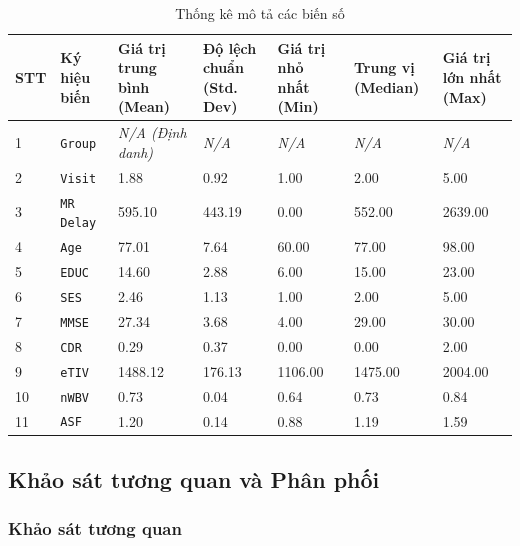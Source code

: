 \begin{table}[h!]
    \centering
    \renewcommand{\arraystretch}{1.3}
    \setlength{\tabcolsep}{6pt}
    \begin{tabular}{|p{1cm}|p{2.5cm}|p{2.5cm}|p{2.5cm}|p{2.2cm}|p{2.2cm}|p{2.2cm}|}
        \hline
        \rowcolor[rgb]{0.8, 0.9, 1.0}
        \textbf{STT} & \textbf{Ký hiệu biến} & \textbf{Giá trị trung bình (Mean)} & \textbf{Độ lệch chuẩn (Std. Dev)} & \textbf{Giá trị nhỏ nhất (Min)} & \textbf{Trung vị (Median)} & \textbf{Giá trị lớn nhất (Max)} \\ \hline
        1 & \texttt{Group} & \textit{N/A (Định danh)} & \textit{N/A} & \textit{N/A} & \textit{N/A} & \textit{N/A} \\ \hline
        2 & \texttt{Visit} & 1.88 & 0.92 & 1.00 & 2.00 & 5.00 \\ \hline
        3 & \texttt{MR Delay} & 595.10 & 443.19 & 0.00 & 552.00 & 2639.00 \\ \hline
        4 & \texttt{Age} & 77.01 & 7.64 & 60.00 & 77.00 & 98.00 \\ \hline
        5 & \texttt{EDUC} & 14.60 & 2.88 & 6.00 & 15.00 & 23.00 \\ \hline
        6 & \texttt{SES} & 2.46 & 1.13 & 1.00 & 2.00 & 5.00 \\ \hline
        7 & \texttt{MMSE} & 27.34 & 3.68 & 4.00 & 29.00 & 30.00 \\ \hline
        8 & \texttt{CDR} & 0.29 & 0.37 & 0.00 & 0.00 & 2.00 \\ \hline
        9 & \texttt{eTIV} & 1488.12 & 176.13 & 1106.00 & 1475.00 & 2004.00 \\ \hline
        10 & \texttt{nWBV} & 0.73 & 0.04 & 0.64 & 0.73 & 0.84 \\ \hline
        11 & \texttt{ASF} & 1.20 & 0.14 & 0.88 & 1.19 & 1.59 \\ \hline
    \end{tabular}
    \caption{Thống kê mô tả các biến số}
\end{table}

\newpage

\subsection{Khảo sát tương quan và Phân phối}

\subsubsection{Khảo sát tương quan}

